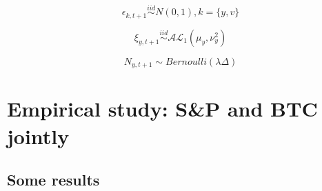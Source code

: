 \documentclass{article}
\begin{document}
$$\epsilon_{k,t+1} \overset{iid}{\sim} N(0,1), k = \{y,v\}$$

$$\xi_{y,t+1} \overset{iid}{\sim} \mathcal{AL}_1(\mu_y, \nu_y^2)$$

$$N_{y,t+1} \sim Bernoulli(\lambda\Delta)$$

\newpage
\section{Empirical study: S\&P and BTC jointly}

\subsection{Some results}
\end{document}
